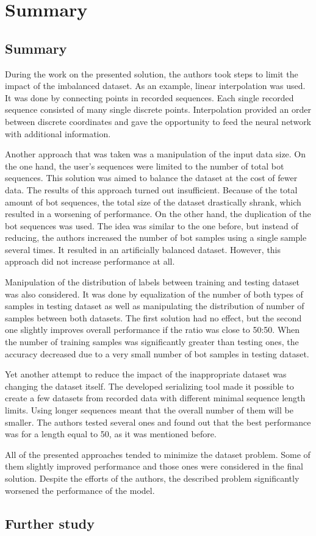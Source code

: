 \chapter{Summary}\label{ch:summary}

\section{Summary}\label{sec:summary}
During the work on the presented solution, the authors took steps to limit the impact of the imbalanced dataset.
As an example, linear interpolation was used.
It was done by connecting points in recorded sequences.
Each single recorded sequence consisted of many single discrete points.
Interpolation provided an order between discrete coordinates and gave the opportunity to feed the neural network with additional information.

Another approach that was taken was a manipulation of the input data size.
On the one hand, the user's sequences were limited to the number of total bot sequences.
This solution was aimed to balance the dataset at the cost of fewer data.
The results of this approach turned out insufficient.
Because of the total amount of bot sequences, the total size of the dataset drastically shrank, which resulted in a worsening of performance.
On the other hand, the duplication of the bot sequences was used.
The idea was similar to the one before, but instead of reducing, the authors increased the number of bot samples using a single sample several times.
It resulted in an artificially balanced dataset.
However, this approach did not increase performance at all.

Manipulation of the distribution of labels between training and testing dataset was also considered.
It was done by equalization of the number of both types of samples in testing dataset as well as manipulating the distribution of number of samples between both datasets.
The first solution had no effect, but the second one slightly improves overall performance if the ratio was close to \num{50}:\num{50}.
When the number of training samples was significantly greater than testing ones, the accuracy decreased due to a very small number of bot samples in testing dataset.

Yet another attempt to reduce the impact of the inappropriate dataset was changing the dataset itself.
The developed serializing tool made it possible to create a few datasets from recorded data with different minimal sequence length limits.
Using longer sequences meant that the overall number of them will be smaller.
The authors tested several ones and found out that the best performance was for a length equal to \num{50}, as it was mentioned before.

All of the presented approaches tended to minimize the dataset problem.
Some of them slightly improved performance and those ones were considered in the final solution.
Despite the efforts of the authors, the described problem significantly worsened the performance of the model.

\section{Further study}\label{sec:further-study}